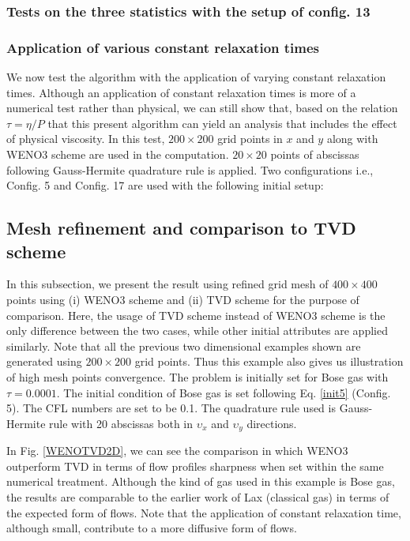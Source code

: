 \documentclass{rsproca}%
\begin{document}
\subsubsection{Tests on the three statistics with the setup of config. 13}
\label{configuration13}

\subsubsection{Application of various constant relaxation times}
\label{difftau}
We now test the algorithm with the application of varying constant relaxation times. Although an application of constant relaxation times is more of a numerical test rather than physical, we can still show that, based on the relation $\tau = \eta/P$ that this present algorithm can yield an analysis that includes the effect of physical viscosity. In this test, $200 \times 200$ grid points in $x$ and $y$ along with WENO3 scheme are used in the computation. $20 \times 20$ points of abscissas following Gauss-Hermite quadrature rule is applied. Two configurations i.e., Config. 5 and Config. 17 are used with the following initial setup:

\subsection{Mesh refinement and comparison to TVD scheme}
In this subsection, we present the result using refined grid mesh of $400 \times 400$ points using (i) WENO3 scheme and (ii) TVD scheme for the purpose of comparison. Here, the usage of TVD scheme instead of WENO3 scheme is the only difference between the two cases, while other initial attributes are applied similarly. Note that all the previous two dimensional examples shown are generated using $200 \times 200$ grid points. Thus this example also gives us illustration of high mesh points convergence. The problem is initially set for Bose gas with $\tau = 0.0001$. The initial condition of Bose gas is set following Eq. \ref{init5} (Config. 5). The CFL numbers are set to be 0.1. The quadrature rule used is Gauss-Hermite rule with 20 abscissas both in $\upsilon_x$ and $\upsilon_y$ directions.

In Fig. \ref{WENOTVD2D}, we can see the comparison in which WENO3 outperform TVD in terms of flow profiles sharpness when set within the same numerical treatment. Although the kind of gas used in this example is Bose gas, the results are comparable to the earlier work of Lax \cite{Laxliu95} (classical gas) in terms of the expected form of flows. Note that the application of constant relaxation time, although small, contribute to a more diffusive form of flows.
\end{document}
